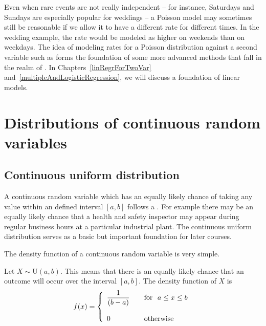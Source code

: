Even when rare events are not really independent -- for instance, Saturdays and Sundays are especially popular for weddings -- a Poisson model may sometimes still be reasonable if we allow it to have a different rate for different times. In the wedding example, the rate would be modeled as higher on weekends than on weekdays. The idea of modeling rates for a Poisson distribution against a second variable such as  forms the foundation of some more advanced methods that fall in the realm of . In Chapters~\ref{linRegrForTwoVar} and~\ref{multipleAndLogisticRegression}, we will discuss a foundation of linear models.











\section{Distributions of continuous random variables}


\subsection{Continuous uniform distribution}
\label{sectionContinuousUniform}


A continuous random variable which has an equally likely chance of taking any value within an 
defined interval $[a, b]$ follows a .
For example there may be an equally likely chance that a health and safety inspector
may appear during regular business hours at a particular industrial plant.
The continuous uniform distribution serves as a basic but important foundation for later courses.

The density function of a continuous random variable is very simple. 


\begin{termBox}{ 
Let $X \sim \text{U}(a, b)$.
This means that there is an equally likely chance that an outcome will occur over the interval $[a,b]$. 
The density function of $X$ is
\[ f(x) = \left\{ 
  \begin{array}{l l}
    \displaystyle\frac{1}{(b - a)}	& \quad \text{for }  ~ a \leq x \leq b\\
	\hfill\\
	0 					& \quad \text{otherwise}
  \end{array} \right.\]
}
\end{termBox}

